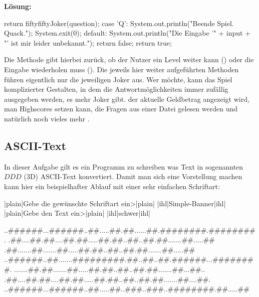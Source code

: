 \documentclass[table]{sopra-base}
\makeatletter
\newenvironment{solution}{\null\par\noindent\textbf{\textcolor{sob@col@uulm@cs}{Lösung:}}\newline\bgroup\color{black}\slshape\ignorespaces}{\egroup}
\makeatother
\begin{document}
\begin{solution}
{\begin{java}[firstnumber=106,add to literate={A34_Question}{{\solGet{keywordC}{A34\_Question}}}{11}]
{{            return fiftyfiftyJoker(question);
        case 'Q':
            System.out.println("Beende Spiel. Quack.");
            System.exit(0);
        default:
            System.out.println("Die Eingabe '" + input + 
                               "' ist mir leider unbekannt.");
            return false;
    }
    return true;
}
\end{java}
}
    Die Methode gibt hierbei zurück, ob der Nutzer ein Level weiter kann () oder die Eingabe wiederholen muss (). Die jeweils hier weiter aufgeführten Methoden führen eigentlich nur die jeweiligen Joker aus. Wer möchte, kann das Spiel komplizierter Gestalten, in dem die Antwortmöglichkeiten immer zufällig ausgegeben werden, es mehr Joker gibt. der aktuelle Geldbetrag angezeigt wird, man Highscores setzen kann, die Fragen aus einer Datei gelesen werden und natürlich noch vieles mehr \Laughey.
\end{solution}


\subsection{ASCII-Text}

In dieser Aufgabe gilt es ein Programm zu schreiben was Text in sogenannten $DDD$ (3D) ASCII-Text konvertiert. Damit man sich
eine Vorstellung machen kann hier ein beispielhafter Ablauf mit einer sehr einfachen Schriftart:
\begin{plainjava}
|plain|Gebe die gewünschte Schriftart ein>|plain| |ihl|Simple-Banner|ihl|
|plain|Gebe den Text ein>|plain| |ihl|schwer|ihl|

..######...######..##.....##.##......##.########.########.
.##....##.##....##.##.....##.##..##..##.##.......##.....##
.##.......##.......##.....##.##..##..##.##.......##.....##
..######..##.......#########.##..##..##.######...########.
.......##.##.......##.....##.##..##..##.##.......##...##..
.##....##.##....##.##.....##.##..##..##.##.......##....##.
..######...######..##.....##..###..###..########.##.....##
\end{plainjava}
\end{document}
